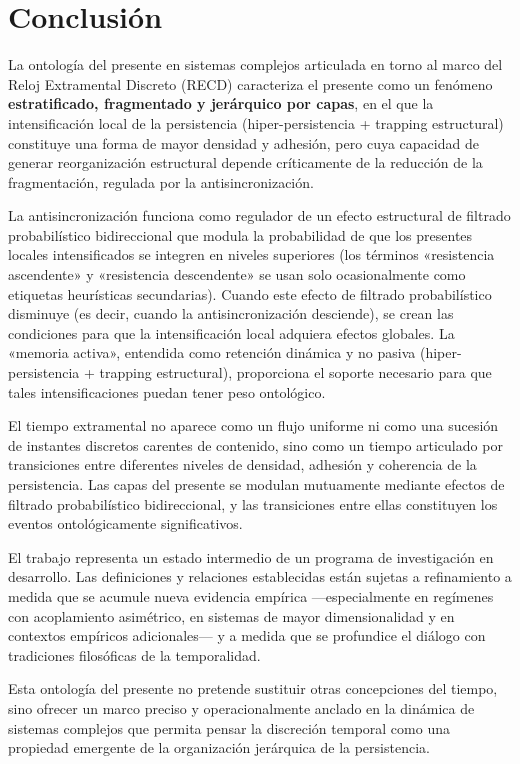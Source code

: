 \section{Conclusión}

La ontología del presente en sistemas complejos articulada en torno al marco del Reloj Extramental Discreto (RECD) caracteriza el presente como un fenómeno \textbf{estratificado, fragmentado y jerárquico por capas}, en el que la intensificación local de la persistencia (hiper-persistencia + trapping estructural) constituye una forma de mayor densidad y adhesión, pero cuya capacidad de generar reorganización estructural depende críticamente de la reducción de la fragmentación, regulada por la antisincronización.

La antisincronización funciona como regulador de un efecto estructural de filtrado probabilístico bidireccional que modula la probabilidad de que los presentes locales intensificados se integren en niveles superiores (los términos «resistencia ascendente» y «resistencia descendente» se usan solo ocasionalmente como etiquetas heurísticas secundarias). Cuando este efecto de filtrado probabilístico disminuye (es decir, cuando la antisincronización desciende), se crean las condiciones para que la intensificación local adquiera efectos globales. La «memoria activa», entendida como retención dinámica y no pasiva (hiper-persistencia + trapping estructural), proporciona el soporte necesario para que tales intensificaciones puedan tener peso ontológico.

El tiempo extramental no aparece como un flujo uniforme ni como una sucesión de instantes discretos carentes de contenido, sino como un tiempo articulado por transiciones entre diferentes niveles de densidad, adhesión y coherencia de la persistencia. Las capas del presente se modulan mutuamente mediante efectos de filtrado probabilístico bidireccional, y las transiciones entre ellas constituyen los eventos ontológicamente significativos.

El trabajo representa un estado intermedio de un programa de investigación en desarrollo. Las definiciones y relaciones establecidas están sujetas a refinamiento a medida que se acumule nueva evidencia empírica —especialmente en regímenes con acoplamiento asimétrico, en sistemas de mayor dimensionalidad y en contextos empíricos adicionales— y a medida que se profundice el diálogo con tradiciones filosóficas de la temporalidad.

Esta ontología del presente no pretende sustituir otras concepciones del tiempo, sino ofrecer un marco preciso y operacionalmente anclado en la dinámica de sistemas complejos que permita pensar la discreción temporal como una propiedad emergente de la organización jerárquica de la persistencia.